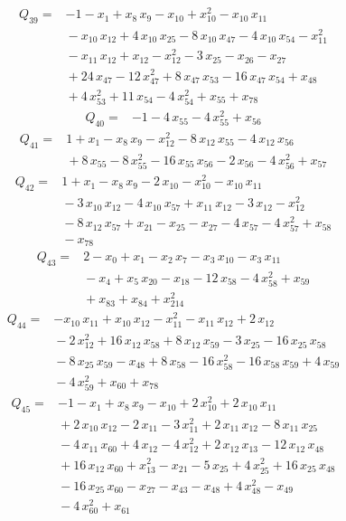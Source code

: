 \documentclass[11pt]{article}
\theoremstyle{definition}\newtheorem{definition}[theorem]{Definition}
\begin{document}
\begin{align*}
Q_{39}={}&-1-x_{1}+x_{8}\,x_{9}-x_{10}+x_{10}^{2}-x_{10}\,x_{11}
\\ &{}-x_{10}\,x_{12}+4\,x_{10}\,x_{25}-8\,x_{10}\,x_{47}-4\,x_{10}\,x_{54}-x_{11}^{2}
\\ &{}-x_{11}\,x_{12}+x_{12}-x_{12}^{2}-3\,x_{25}-x_{26}-x_{27}
\\ &{}+24\,x_{47}-12\,x_{47}^{2}+8\,x_{47}\,x_{53}-16\,x_{47}\,x_{54}+x_{48}
\\ &{}+4\,x_{53}^{2}+11\,x_{54}-4\,x_{54}^{2}+x_{55}+x_{78}
\end{align*}
\begin{align*}
Q_{40}={}&-1-4\,x_{55}-4\,x_{55}^{2}+x_{56}
\end{align*}
\begin{align*}
Q_{41}={}&1+x_{1}-x_{8}\,x_{9}-x_{12}^{2}-8\,x_{12}\,x_{55}-4\,x_{12}\,x_{56}
\\ &{}+8\,x_{55}-8\,x_{55}^{2}-16\,x_{55}\,x_{56}-2\,x_{56}-4\,x_{56}^{2}+x_{57}
\end{align*}
\begin{align*}
Q_{42}={}&1+x_{1}-x_{8}\,x_{9}-2\,x_{10}-x_{10}^{2}-x_{10}\,x_{11}
\\ &{}-3\,x_{10}\,x_{12}-4\,x_{10}\,x_{57}+x_{11}\,x_{12}-3\,x_{12}-x_{12}^{2}
\\ &{}-8\,x_{12}\,x_{57}+x_{21}-x_{25}-x_{27}-4\,x_{57}-4\,x_{57}^{2}+x_{58}
\\ &{}-x_{78}
\end{align*}
\begin{align*}
Q_{43}={}&2-x_{0}+x_{1}-x_{2}\,x_{7}-x_{3}\,x_{10}-x_{3}\,x_{11}
\\ &{}-x_{4}+x_{5}\,x_{20}-x_{18}-12\,x_{58}-4\,x_{58}^{2}+x_{59}
\\ &{}+x_{83}+x_{84}+x_{214}^{2}
\end{align*}
\begin{align*}
Q_{44}={}&-x_{10}\,x_{11}+x_{10}\,x_{12}-x_{11}^{2}-x_{11}\,x_{12}+2\,x_{12}
\\ &{}-2\,x_{12}^{2}+16\,x_{12}\,x_{58}+8\,x_{12}\,x_{59}-3\,x_{25}-16\,x_{25}\,x_{58}
\\ &{}-8\,x_{25}\,x_{59}-x_{48}+8\,x_{58}-16\,x_{58}^{2}-16\,x_{58}\,x_{59}+4\,x_{59}
\\ &{}-4\,x_{59}^{2}+x_{60}+x_{78}
\end{align*}
\begin{align*}
Q_{45}={}&-1-x_{1}+x_{8}\,x_{9}-x_{10}+2\,x_{10}^{2}+2\,x_{10}\,x_{11}
\\ &{}+2\,x_{10}\,x_{12}-2\,x_{11}-3\,x_{11}^{2}+2\,x_{11}\,x_{12}-8\,x_{11}\,x_{25}
\\ &{}-4\,x_{11}\,x_{60}+4\,x_{12}-4\,x_{12}^{2}+2\,x_{12}\,x_{13}-12\,x_{12}\,x_{48}
\\ &{}+16\,x_{12}\,x_{60}+x_{13}^{2}-x_{21}-5\,x_{25}+4\,x_{25}^{2}+16\,x_{25}\,x_{48}
\\ &{}-16\,x_{25}\,x_{60}-x_{27}-x_{43}-x_{48}+4\,x_{48}^{2}-x_{49}
\\ &{}-4\,x_{60}^{2}+x_{61}
\end{align*}
\end{document}
